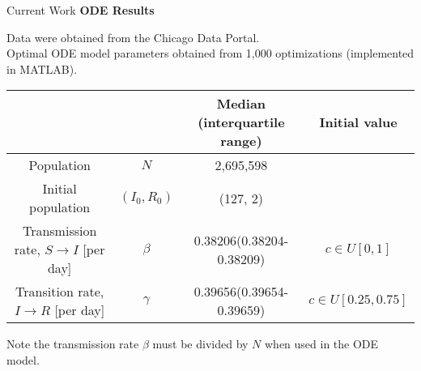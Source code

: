 \begin{slide}{Current Work}
	{\large \textbf{ODE Results}} \\
	
	\vspace{.5cm}
	
	Data were obtained from the Chicago Data Portal. \\
	Optimal ODE model parameters obtained from 1,000 optimizations (implemented in MATLAB). \\
	
	\vspace{.3cm}
	
	\begin{table}[h]
		\centering
		\label{tab:parameters}
		\begin{tabular}{ c c c c }
			\hline
			\hline
			&	&	Median (interquartile range)	&	Initial value \\
			\hline
			Population	&	$N$	&	2,695,598	& \\
			Initial population	&	$(I_0, R_0)$	&	(127, 2)	& \\
			Transmission rate, $S \rightarrow I$ [per day]	&	$\beta$	&	0.38206(0.38204-0.38209)	&	$c \in U[0,1]$ \\
			Transition rate, $I \rightarrow R$ [per day]	&	$\gamma$	&	 0.39656(0.39654-0.39659)	&	$c \in U[0.25,0.75]$ \\
			\hline
			\hline
		\end{tabular}
	\end{table}
	
	Note the transmission rate $\beta$ must be divided by $N$ when used in the ODE model.
\end{slide}